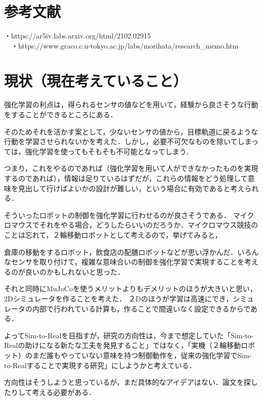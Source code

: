 \documentclass[a4paper,11pt]{jsarticle}
\begin{document}
\section{参考文献}
・https://ar5iv.labs.arxiv.org/html/2102.02915
\\
　・https://www.graco.c.u-tokyo.ac.jp/labs/morihata/research\_memo.htm

\section{現状（現在考えていること）}
強化学習の利点は，得られるセンサの値などを用いて，経験から良さそうな行動をすることができるところにある．\par
そのためそれを活かす案として，少ないセンサの値から，目標軌道に戻るような行動を学習させられないかを考えた．しかし，必要不可欠なものを除いてしまっては，強化学習を使ってもそもそも不可能となってしまう．\par
つまり，これをやるのであれば（強化学習を用いて人ができなかったものを実現するのであれば），情報は足りているはずだが，これらの情報をどう処理して意味を見出して行けばよいかの設計が難しい，という場合に有効であると考えられる．\par
そういったロボットの制御を強化学習に行わせるのが良さそうである．
マイクロマウスでそれをやる場合，どうしたらいいのだろうか．マイクロマウス競技のことは忘れて，２輪移動ロボットとして考えるので，挙げてみると，\par
倉庫の移動をするロボット，飲食店の配膳ロボットなどが思い浮かんだ．いろんなセンサを取り付けて，複雑な意味合いの制御を強化学習で実現することを考えるのが良いのかもしれないと思った．\par
それと同時にMuJoCoを使うメリットよりもデメリットのほうが大きいと思い，2Dシミュレータを作ることを考えた．
２Dのほうが学習は高速にでき，シミュレータの内部で行われている計算も，作ることで間違いなく設定できるからである．\par
よってSim-to-Realを目指すが，研究の方向性は，今まで想定していた「Sim-to-Realの助けになる新たな工夫を発見すること」ではなく，「実機（２輪移動ロボット）のまだ誰もやっていない意味を持つ制御動作を，従来の強化学習でSim-to-Realすることで実現する研究」にしようかと考えている．\par
方向性はそうしようと思っているが，まだ具体的なアイデアはない．論文を探したりして考える必要がある．
\end{document}
